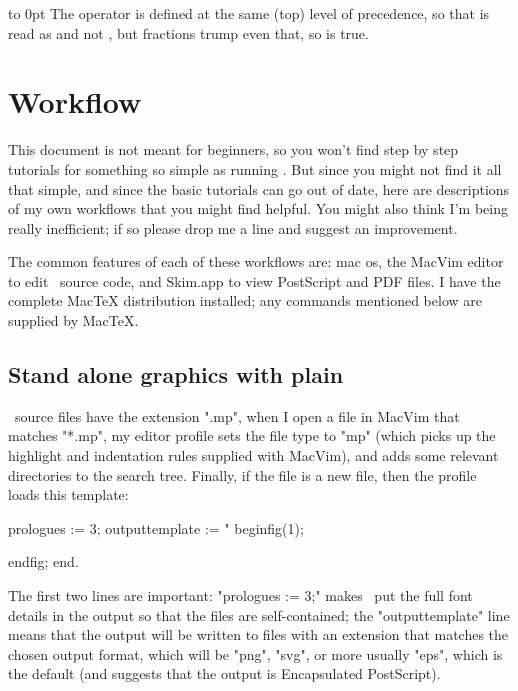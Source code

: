 \documentclass[a4paper,landscape]{article}
\begin{document}
\vskip -22pt
\vbox to 0pt{\vss\hsize 4in\noindent
The  operator is defined at the same (top) level of precedence, so
that  is read as  and not , but fractions
trump even that, so  is true.}

\newpage
\section{Workflow}

This document is not meant for beginners, so you won't find step by step tutorials
for something so simple as running \MP.  But since you might not find it all that
simple, and since the basic tutorials can go out of date, here are descriptions of
my own workflows that you might find helpful.  You might also think I'm being really
inefficient; if so please drop me a line and suggest an improvement.

The common features of each of these workflows are: mac os, the MacVim editor to
edit \MP\ source code, and
Skim.app to view PostScript and PDF files.  I have the complete MacTeX distribution
installed; any commands mentioned below are supplied by MacTeX.

\subsection{Stand alone graphics with plain \MP}\label{sec:plain-flow}

\MP\ source files have the extension ".mp", when I open a file in MacVim that
matches "*.mp", my editor profile sets the file type to "mp" (which picks up the
highlight and indentation rules supplied with MacVim), and adds some relevant
directories to the search tree.  Finally, if the file is a new file, then the
profile loads this template:
\begin{smallcode}
prologues := 3;
outputtemplate := "%
beginfig(1);

endfig;
end.
\end{smallcode}
The first two lines are important: "prologues := 3;" makes \MP\ put the full font
details in the output so that the files are self-contained; the "outputtemplate"
line means that the output will be written to files with an extension that matches
the chosen output format, which will be "png", "svg", or more usually "eps", which
is the default (and suggests that the output is Encapsulated PostScript).
\end{document}
